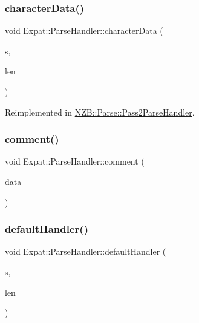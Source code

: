 \subsubsection{\texorpdfstring{character\+Data()}{characterData()}}
{\footnotesize\ttfamily void Expat\+::\+Parse\+Handler\+::character\+Data (\begin{DoxyParamCaption}\item[{const X\+M\+L\+\_\+\+Char $\ast$}]{s,  }\item[{int}]{len }\end{DoxyParamCaption})\hspace{0.3cm}{\ttfamily [virtual]}}



Reimplemented in \hyperlink{class_n_z_b_1_1_parse_1_1_pass2_parse_handler_adafb3081bcec7653a9b0b3ce8f25a1a5}{N\+Z\+B\+::\+Parse\+::\+Pass2\+Parse\+Handler}.

\hypertarget{class_expat_1_1_parse_handler_a1a4635db36fc5f7abae3deb6ea47becc}{}\label{class_expat_1_1_parse_handler_a1a4635db36fc5f7abae3deb6ea47becc} 
\subsubsection{\texorpdfstring{comment()}{comment()}}
{\footnotesize\ttfamily void Expat\+::\+Parse\+Handler\+::comment (\begin{DoxyParamCaption}\item[{const X\+M\+L\+\_\+\+Char $\ast$}]{data }\end{DoxyParamCaption})\hspace{0.3cm}{\ttfamily [virtual]}}

\hypertarget{class_expat_1_1_parse_handler_a652aca387f4ed68e0178e89b75adb651}{}\label{class_expat_1_1_parse_handler_a652aca387f4ed68e0178e89b75adb651} 
\subsubsection{\texorpdfstring{default\+Handler()}{defaultHandler()}}
{\footnotesize\ttfamily void Expat\+::\+Parse\+Handler\+::default\+Handler (\begin{DoxyParamCaption}\item[{const X\+M\+L\+\_\+\+Char $\ast$}]{s,  }\item[{int}]{len }\end{DoxyParamCaption})\hspace{0.3cm}{\ttfamily [virtual]}}


